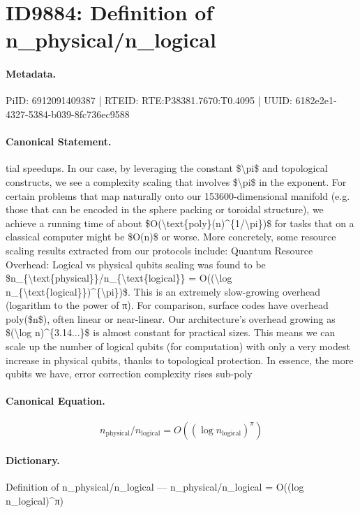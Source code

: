 \section*{ID9884: Definition of n\_physical/n\_logical}
\paragraph{Metadata.}
PiID: 6912091409387 | RTEID: RTE:P38381.7670:T0.4095 | UUID: 6182e2e1-4327-5384-b039-8fc736ec9588

\paragraph{Canonical Statement.}
tial speedups. In our case, by leveraging the constant \$\textbackslash{}pi\$ and topological constructs, we see a complexity scaling that involves \$\textbackslash{}pi\$ in the exponent. For certain problems that map naturally onto our 153600-dimensional manifold (e.g. those that can be encoded in the sphere packing or toroidal structure), we achieve a running time of about \$O(\textbackslash{}text\{poly\}(n)\textasciicircum{}\{1/\textbackslash{}pi\})\$ for tasks that on a classical computer might be \$O(n)\$ or worse. More concretely, some resource scaling results extracted from our protocols include: Quantum Resource Overhead: Logical vs physical qubits scaling was found to be \$n\_\{\textbackslash{}text\{physical\}\}/n\_\{\textbackslash{}text\{logical\}\} = O((\textbackslash{}log n\_\{\textbackslash{}text\{logical\}\})\textasciicircum{}\{\textbackslash{}pi\})\$. This is an extremely slow-growing overhead (logarithm to the power of π). For comparison, surface codes have overhead poly(\$n\$), often linear or near-linear. Our architecture’s overhead growing as \$(\textbackslash{}log n)\textasciicircum{}\{3.14...\}\$ is almost constant for practical sizes. This means we can scale up the number of logical qubits (for computation) with only a very modest increase in physical qubits, thanks to topological protection. In essence, the more qubits we have, error correction complexity rises sub-poly

\paragraph{Canonical Equation.}
\[
n_{\text{physical}}/n_{\text{logical}} = O((\log n_{\text{logical}})^{\pi})
\]

\paragraph{Dictionary.}
Definition of n\_physical/n\_logical — n\_physical/n\_logical = O((log n\_logical)\textasciicircum{}π)

